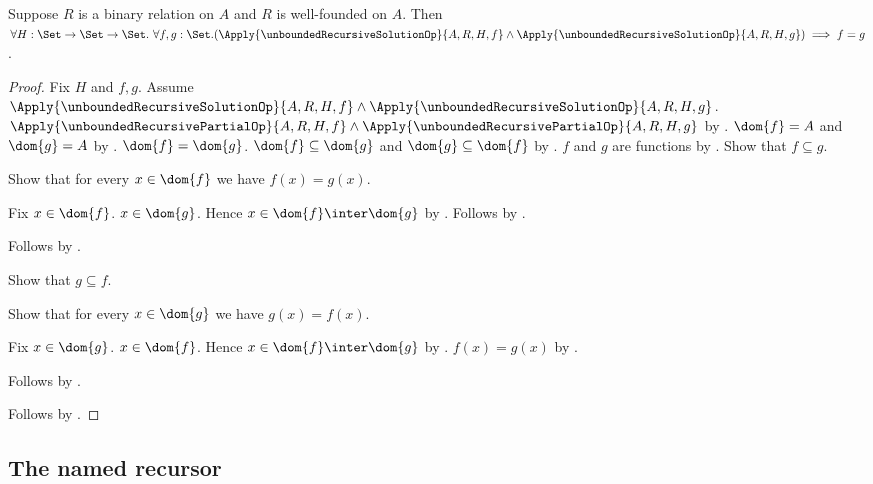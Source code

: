 \begin{theorem}\label{unbounded_well_founded_recursion_unique}
    Suppose $R$ is a binary relation on $A$ and $R$ is well-founded on $A$.
    Then $\forall H:\Set\to\Set\to\Set.\ \forall f,g:\Set.
        (\Apply{\unboundedRecursiveSolutionOp}
            {A,R,H,f}\land
         \Apply{\unboundedRecursiveSolutionOp}
            {A,R,H,g})
        \implies f=g$.
\end{theorem}
\begin{proof}
    Fix $H$ and $f,g$.
    Assume
        $\Apply{\unboundedRecursiveSolutionOp}
            {A,R,H,f}\land
         \Apply{\unboundedRecursiveSolutionOp}
            {A,R,H,g}$.
    $\Apply{\unboundedRecursivePartialOp}
        {A,R,H,f}\land
     \Apply{\unboundedRecursivePartialOp}
        {A,R,H,g}$ by .
    $\dom{f}=A$ and $\dom{g}=A$ by
        .
    $\dom{f}=\dom{g}$.
    $\dom{f}\subseteq\dom{g}$ and $\dom{g}\subseteq\dom{f}$ by
        .
    $f$ and $g$ are functions by
        .
    Show that $f\subseteq g$.
    \begin{subproof}
        Show that for every $x\in\dom{f}$ we have $f(x)=g(x)$.
        \begin{subproof}
            Fix $x\in\dom{f}$.
            $x\in\dom{g}$.
            Hence $x\in\dom{f}\inter\dom{g}$ by .
            Follows by .
        \end{subproof}
        Follows by .
    \end{subproof}
    Show that $g\subseteq f$.
    \begin{subproof}
        Show that for every $x\in\dom{g}$ we have $g(x)=f(x)$.
        \begin{subproof}
            Fix $x\in\dom{g}$.
            $x\in\dom{f}$.
            Hence $x\in\dom{f}\inter\dom{g}$ by .
            $f(x)=g(x)$ by .
        \end{subproof}
        Follows by .
    \end{subproof}
    Follows by .
\end{proof}

\subsection{The named recursor}

